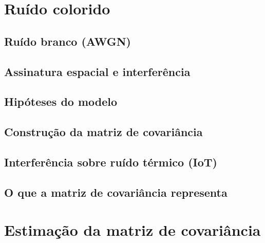 \section{Ruído colorido}\label{sec:ruido-colorido}

\subsection{Ruído branco (AWGN)}
\subsection{Assinatura espacial e interferência}
\subsection{Hipóteses do modelo}
\subsection{Construção da matriz de covariância}\label{subsec:construcao-R}
\subsection{Interferência sobre ruído térmico (IoT)}
\subsection{O que a matriz de covariância representa}\label{subsec:o-que-R-representa}

\section{Estimação da matriz de covariância}\label{sec:estimacao-R}

